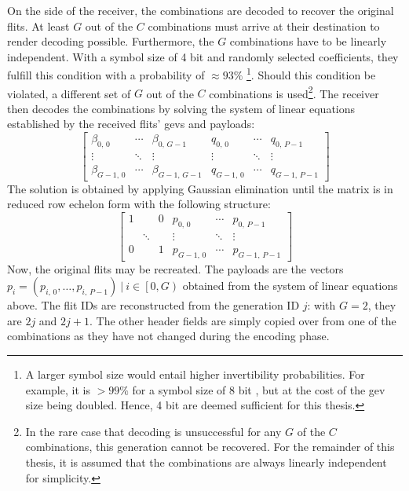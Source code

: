 On the side of the receiver, the combinations are decoded to recover the original flits. At least $G$ out of the $C$ combinations must arrive at their
destination to render decoding possible. Furthermore, the $G$ combinations have to be linearly independent. With a symbol size of 4 bit and randomly
selected coefficients, they fulfill this condition with a probability of $\approx 93\%$ \cite[4]{franz18authdraft}\footnote{A larger symbol size would
entail higher invertibility probabilities. For example, it is $>99\%$ for a symbol size of 8 bit \cite[4]{franz18authdraft}, but at the cost of the
\gls{gev} size being doubled. Hence, 4 bit are deemed sufficient for this thesis.}. Should this condition be violated, a different set of $G$ out of
the $C$ combinations is used\footnote{In the rare case that decoding is unsuccessful for any $G$ of the $C$ combinations, this generation cannot be
recovered. For the remainder of this thesis, it is assumed that the combinations are always linearly independent for simplicity.}. The receiver then
decodes the combinations by solving the system of linear equations established by the received flits' \glspl{gev} and payloads:
\[
    \begin{bmatrix}
        \beta_{0,\,0} & \cdots & \beta_{0,\,G-1} & q_{0,\,0} & \cdots & q_{0,\,P-1} \\
        \vdots & \ddots & \vdots & \vdots & \ddots & \vdots \\
        \beta_{G-1,\,0} & \cdots & \beta_{G-1,\,G-1} & q_{G-1,\,0} & \cdots & q_{G-1,\,P-1}
    \end{bmatrix}
\]
The solution is obtained by applying Gaussian elimination until the matrix is in reduced row echelon form with the following structure:
\[
    \begin{bmatrix}
        1 & & 0 & p_{0,\,0} & \cdots & p_{0,\,P-1} \\
        & \ddots & & \vdots & \ddots & \vdots \\
        0 & & 1 & p_{G-1,\,0} & \cdots & p_{G-1,\,P-1}
    \end{bmatrix}
\]
Now, the original flits may be recreated. The payloads are the vectors $p_i = (p_{i,\,0}, …, p_{i,\,P-1})\ |\ i \in \left[0, G\right)$ obtained from
the system of linear equations above. The flit IDs are reconstructed from the generation ID $j$: with $G = 2$, they are $2j$ and $2j+1$. The other
header fields are simply copied over from one of the combinations as they have not changed during the encoding phase.

